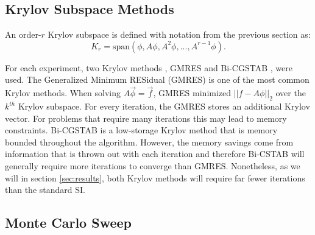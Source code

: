  

\subsection{Krylov Subspace Methods}

An order-$r$ Krylov subspace is defined with notation from the previous section as:
\begin{equation}
K_r = \textrm{span}(\phi, A\phi, A^{2}\phi, ..., A^{r-1}\phi).
\end{equation}

For each experiment, two Krylov methods \cite{ctk:roots}, GMRES \cite{gmres} and Bi-CGSTAB \cite{bicgstab}, were used. The Generalized Minimum RESidual (GMRES) is one of the most common Krylov methods. When solving $A\vec{\phi}=\vec{f}$, GMRES minimized $||f-A\phi||_2$ over the $k^{th}$ Krylov subspace. For every iteration, the GMRES stores an additional Krylov vector. For problems that require many iterations this may lead to memory constraints. Bi-CGSTAB is a low-storage Krylov method that is memory bounded throughout the algorithm. However, the memory savings come from information that is thrown out with each iteration and therefore Bi-CSTAB will generally require more iterations to converge than GMRES. Nonetheless, as we will in section \ref{sec:results}, both Krylov methods will require far fewer iterations than the standard SI. 



\subsection{Monte Carlo Sweep}

